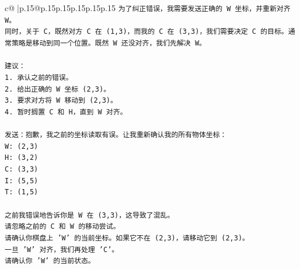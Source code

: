 \documentclass{article}
\begin{document}
{\begin{supertabular}{c@{$\;$}|p{.15\linewidth}@{}p{.15\linewidth}p{.15\linewidth}p{.15\linewidth}p{.15\linewidth}p{.15\linewidth}}
{{{\texttt{为了纠正错误，我需要发送正确的 W 坐标，并重新对齐 W。} \\
\texttt{同时，关于 C，既然对方 C 在 (1,3)，而我的 C 在 (3,3)，我们需要决定 C 的目标。通常策略是移动到同一个位置。既然 W 还没对齐，我们先解决 W。} \\
\\ 
\texttt{建议：} \\
\texttt{1. 承认之前的错误。} \\
\texttt{2. 给出正确的 W 坐标 (2,3)。} \\
\texttt{3. 要求对方将 W 移动到 (2,3)。} \\
\texttt{4. 暂时搁置 C 和 H，直到 W 对齐。} \\
\\ 
\texttt{发送：抱歉，我之前的坐标读取有误。让我重新确认我的所有物体坐标：} \\
\texttt{W: (2,3)} \\
\texttt{H: (3,2)} \\
\texttt{C: (3,3)} \\
\texttt{I: (5,5)} \\
\texttt{T: (1,5)} \\
\\ 
\texttt{之前我错误地告诉你是 W 在 (3,3)，这导致了混乱。} \\
\texttt{请忽略之前的 C 和 W 的移动尝试。} \\
\texttt{请确认你棋盘上 'W' 的当前坐标。如果它不在 (2,3)，请移动它到 (2,3)。} \\
\texttt{一旦 'W' 对齐，我们再处理 'C'。} \\
\texttt{请确认你 'W' 的当前状态。} \\
            }
        }
    }
     \\ \\


\end{supertabular}}
\end{document}
